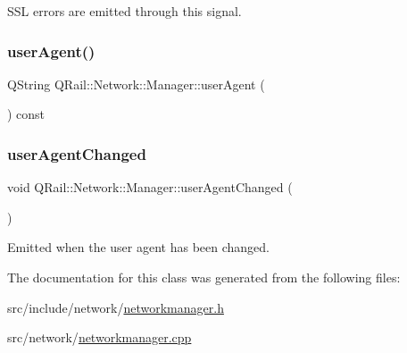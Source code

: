 S\+SL errors are emitted through this signal. 

\mbox{\label{classQRail_1_1Network_1_1Manager_a8163075df6f472c3ae69e0cfa67a7da7}} 
\subsubsection{\texorpdfstring{userAgent()}{userAgent()}}
{\footnotesize\ttfamily Q\+String Q\+Rail\+::\+Network\+::\+Manager\+::user\+Agent (\begin{DoxyParamCaption}{ }\end{DoxyParamCaption}) const}

\mbox{\label{classQRail_1_1Network_1_1Manager_a7041109a640094b8aaeb430e6b09c9bc}} 
\subsubsection{\texorpdfstring{userAgentChanged}{userAgentChanged}}
{\footnotesize\ttfamily void Q\+Rail\+::\+Network\+::\+Manager\+::user\+Agent\+Changed (\begin{DoxyParamCaption}{ }\end{DoxyParamCaption})\hspace{0.3cm}{\ttfamily [signal]}}



Emitted when the user agent has been changed. 



The documentation for this class was generated from the following files\+:\begin{DoxyCompactItemize}
\item 
src/include/network/\mbox{\hyperlink{networkmanager_8h}{networkmanager.\+h}}\item 
src/network/\mbox{\hyperlink{networkmanager_8cpp}{networkmanager.\+cpp}}\end{DoxyCompactItemize}
